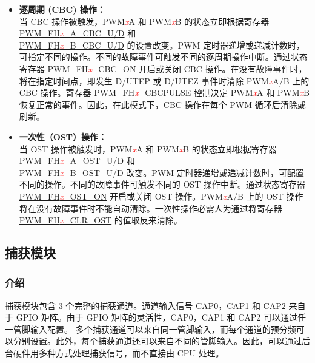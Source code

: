 \documentclass[main\_\_CN.tex]{subfiles}
\begin{document}
\begin{itemize}
    \item {\bfseries 逐周期 (CBC) 操作：}\\
    当 CBC 操作被触发，PWM\textcolor{red}{\it{x}}A 和 PWM\textcolor{red}{\it{x}}B 的状态立即根据寄存器 \hyperref[regdesc:PWMFH0CFG0REG]{PWM\_FH\textcolor{red}{\it{x}}\_A\_CBC\_U/D} 和 \\\hyperref[regdesc:PWMFH0CFG0REG]{PWM\_FH\textcolor{red}{\it{x}}\_B\_CBC\_U/D} 的设置改变。PWM 定时器递增或递减计数时，可指定不同的操作。不同的故障事件可触发不同的逐周期操作中断。通过状态寄存器 \hyperref[regdesc:PWMFH0STATUSREG]{PWM\_FH\textcolor{red}{\it{x}}\_CBC\_ON} 开启或关闭 CBC 操作。在没有故障事件时，将在指定时间点，即发生 D/UTEP 或 D/UTEZ 事件时清除 PWM\textcolor{red}{\it{x}}A/B 上的 CBC 操作。寄存器 \hyperref[regdesc:PWMFH0CFG1REG]{PWM\_FH\textcolor{red}{\it{x}}\_CBCPULSE} 控制决定 PWM\textcolor{red}{\it{x}}A 和 PWM\textcolor{red}{\it{x}}B 恢复正常的事件。因此，在此模式下，CBC 操作在每个 PWM 循环后清除或刷新。
    \item {\bfseries 一次性（OST）操作：}\\
	当 OST 操作被触发时，PWM\textcolor{red}{\it{x}}A 和 PWM\textcolor{red}{\it{x}}B 的状态立即根据寄存器 \hyperref[regdesc:PWMFH0CFG0REG]{PWM\_FH\textcolor{red}{\it{x}}\_A\_OST\_U/D} 和\\\hyperref[regdesc:PWMFH0CFG0REG]{PWM\_FH\textcolor{red}{\it{x}}\_B\_OST\_U/D} 改变。PWM 定时器递增或递减计数时，可配置不同的操作。不同的故障事件可触发不同的 OST 操作中断。通过状态寄存器  \hyperref[regdesc:PWMFH0STATUSREG]{PWM\_FH\textcolor{red}{\it{x}}\_OST\_ON} 开启或关闭 OST 操作。PWM\textcolor{red}{\it{x}}A/B 上的 OST 操作将在没有故障事件时不能自动清除。一次性操作必需人为通过将寄存器 \hyperref[regdesc:PWMFH0CFG0REG]{PWM\_FH\textcolor{red}{\it{x}}\_CLR\_OST} 的值取反来清除。
\end{itemize}

\subsection{捕获模块}
\subsubsection{介绍}

捕获模块包含 3 个完整的捕获通道。通道输入信号 CAP0，CAP1 和 CAP2 来自于 GPIO 矩阵。由于 GPIO 矩阵的灵活性，CAP0，CAP1 和 CAP2 可以通过任一管脚输入配置。 多个捕获通道可以来自同一管脚输入，而每个通道的预分频可以分别设置。此外，每个捕获通道还可以来自不同的管脚输入。因此，可以通过后台硬件用多种方式处理捕获信号，而不直接由 CPU 处理。
\end{document}
